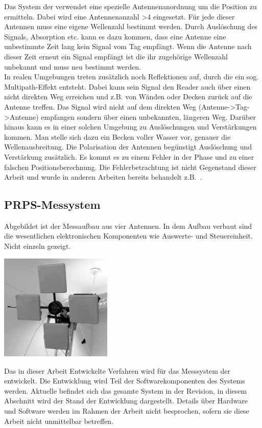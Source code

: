 Das System der \amedogmbh verwendet eine spezielle Antennenanordnung um die Position zu ermitteln. Dabei wird eine Antennenanzahl >4 eingesetzt. Für jede dieser Antennen muss eine eigene Wellenzahl bestimmt werden. Durch Auslöschung des Signals, Absorption etc. kann es dazu kommen, dass eine Antenne eine unbestimmte Zeit lang kein Signal vom Tag empfängt. Wenn die Antenne nach dieser Zeit erneut ein Signal empfängt ist die ihr zugehörige Wellenzahl unbekannt und muss neu bestimmt werden. \\
%

In realen Umgebungen treten zusätzlich noch Reflektionen auf, durch die ein sog. Multipath-Effekt entsteht. Dabei kann sein Signal den Reader auch über einen nicht direkten Weg erreichen und z.B. von Wänden oder Decken zurück auf die Antenne treffen. Das Signal wird nicht auf dem direkten Weg (Antenne->Tag->Antenne) empfangen sondern über einen unbekannten, längeren Weg. Darüber hinaus kann es in einer solchen Umgebung zu Auslöschungen und Verstärkungen kommen. Man stelle sich dazu ein Becken voller Wasser vor, genauer die Wellenausbreitung. Die Polarisation der Antennen begünstigt Auslöschung und Verstärkung zusätzlich. Es kommt es zu einem Fehler in der Phase und zu einer falschen Positionsberechnung. Die Fehlerbetrachtung ist nicht Gegenstand dieser Arbeit und wurde in anderen Arbeiten bereits behandelt z.B.~\cite{Borgwerth1}.
%

\subsection{PRPS-Messystem}
%
\begin{floatingfigure}[hr!]{7cm}
         \centering
         \caption[PRPS der \amedogmbh]{Abgebildet ist der Messaufbau aus vier Antennen. In dem Aufbau verbaut sind die wesentlichen elektronischen Komponenten wie Auswerte- und Steuereinheit. Nicht einzeln gezeigt.}
         \vspace{2mm}
         \label{fig:System}
         \includegraphics[width=0.4\textwidth]{img/4AntennaSetup_small.png}
         \vspace{2mm}
%         
\end{floatingfigure}
%
Das in dieser Arbeit Entwickelte Verfahren wird für das Messsystem der \amedogmbh entwickelt. Die Entwicklung wird Teil der Softwarekomponenten des Systems werden. Aktuelle befindet sich das gesamte System in der Revision, in diesem Abschnitt wird der Stand der Entwicklung dargestellt. Details über Hardware und Software werden im Rahmen der Arbeit nicht besprochen, sofern sie diese Arbeit nicht unmittelbar betreffen. \\
%

